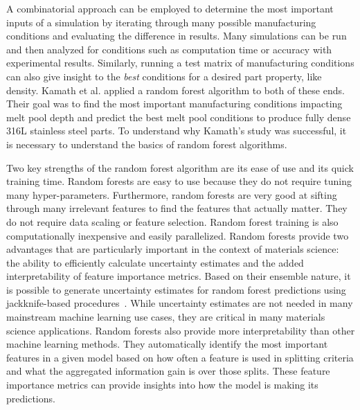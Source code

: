 A combinatorial approach can be employed to determine the most important inputs of a simulation by iterating through many possible manufacturing conditions and evaluating the difference in results. Many simulations can be run and then analyzed for conditions such as computation time or accuracy with experimental results. Similarly, running a test matrix of manufacturing conditions can also give insight to the \textit{best} conditions for a desired part property, like density. Kamath et al. applied a random forest algorithm to both of these ends. Their goal was to find the most important manufacturing conditions impacting melt pool depth and predict the best melt pool conditions to produce fully dense 316L stainless steel parts. To understand why Kamath's study was successful, it is necessary to understand the basics of random forest algorithms. 

Two key strengths of the random forest algorithm are its ease of use and its quick training time. Random forests are easy to use because they do not require tuning many hyper-parameters. Furthermore, random forests are very good at sifting through many irrelevant features to find the features that actually matter. They do not require data scaling or feature selection. Random forest training is also computationally inexpensive and easily parallelized. Random forests provide two advantages that are particularly important in the context of materials science: the ability to efficiently calculate uncertainty estimates and the added interpretability of feature importance metrics. Based on their ensemble nature, it is possible to generate uncertainty estimates for random forest predictions using jackknife-based procedures~\cite{Efron1992, Efron2014, Wager2014}. While uncertainty estimates are not needed in many mainstream machine learning use cases, they are critical in many materials science applications. Random forests also provide more interpretability than other machine learning methods. They automatically identify the most important features in a given model based on how often a feature is used in splitting criteria and what the aggregated information gain is over those splits. These feature importance metrics can provide insights into how the model is making its predictions. 


